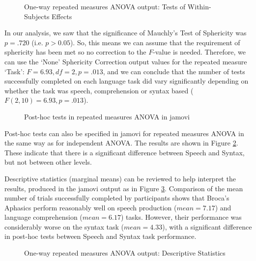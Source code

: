 \begin{figure}[!ht]
\begin{center}
\caption{One-way repeated measures ANOVA output: Tests of Within-Subjects Effects}
\HR
\label{fig:RManova3}
\end{center}
\end{figure}

In our analysis, we saw that the significance of Mauchly’s Test of Sphericity was $p=.720$ (i.e. $p>0.05$). So, this means we can assume that the requirement of sphericity has been met so no correction to the $F$-value is needed. Therefore, we can use the ‘None’ Sphericity Correction output values for the repeated measure ‘Task’: $F=6.93, df=2, p=.013$, and we can conclude that the number of tests successfully completed on each language task did vary significantly depending on whether the task was speech, comprehension or syntax based ($F(2,10) = 6.93, p=.013$).

\begin{figure}[!ht]
\begin{center}
\caption{Post-hoc tests in repeated measures ANOVA in jamovi}
\HR
\label{fig:RManova4}
\end{center}
\end{figure}

Post-hoc tests can also be specified in jamovi for repeated measures ANOVA in the same way as for independent ANOVA. The results are shown in Figure \ref{fig:RManova4}. These indicate that there is a significant difference between Speech and Syntax, but not between other levels.

Descriptive statistics (marginal means) can be reviewed to help interpret the results, produced in the jamovi output as in Figure \ref{fig:RManova5}. Comparison of the mean number of trials successfully completed by participants shows that Broca’s Aphasics perform reasonably well on speech production ($mean=7.17$) and language comprehension ($mean=6.17$) tasks. However, their performance was considerably worse on the syntax task ($mean=4.33$), with a significant difference in post-hoc tests between Speech and Syntax task performance. 

\begin{figure}[!ht]
\begin{center}
\caption{One-way repeated measures ANOVA output: Descriptive Statistics}
\HR
\label{fig:RManova5}
\end{center}
\end{figure}


